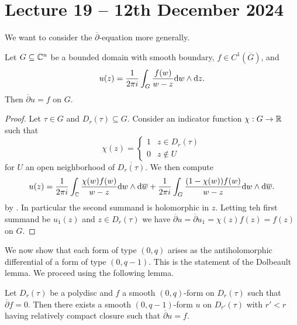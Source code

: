 \section{Lecture 19 -- 12th December 2024}\label{sec: lecture 19}
We want to consider the $\overline{\partial}$-equation more generally. 
\begin{theorem}\label{thm: smooth solution to 0-1 forms}
    Let $G\subseteq\mathbb{C}^{n}$ be a bounded domain with smooth boundary, $f\in C^{1}(\overline{G})$, and 
    $$u(z)=\frac{1}{2\pi i}\int_{G}\frac{f(w)}{w-z}\mathrm{d} w\wedge\mathrm{d} z.$$
    Then $\overline{\partial}u=f$ on $G$.
\end{theorem}
\begin{proof}
    Let $\tau\in G$ and $D_{r}(\tau)\subseteq G$. Consider an indicator function $\chi:G\to\mathbb{R}$ such that 
    $$\chi(z)=\begin{cases}
        1 & z\in D_{r}(\tau) \\
        0 & z\notin U
    \end{cases}$$
    for $U$ an open neighborhood of $\overline{D_{r}(\tau)}$. We then compute 
    $$u(z)=\frac{1}{2\pi i}\int_{\mathbb{C}}\frac{\chi(w)f(w)}{w-z}\mathrm{d} w\wedge\mathrm{d}\overline{w}+\frac{1}{2\pi i}\int_{G}\frac{(1-\chi(w))f(w)}{w-z}\mathrm{d} w\wedge\mathrm{d}\overline{w}.$$
    by . In particular the second summand is holomorphic in $z$. Letting teh first summand be $u_{1}(z)$ and $z\in D_{r}(\tau)$ we have $\overline{\partial}u=\overline{\partial} u_{1}=\chi(z)f(z)=f(z)$ on $G$. 
\end{proof}
We now show that each form of type $(0,q)$ arises as the antiholomorphic differential of a form of type $(0,q-1)$. This is the statement of the Dolbeault lemma. We proceed using the following lemma. 
\begin{lemma}\label{lem: Dolbeault lemma preparation}
    Let $D_{r}(\tau)$ be a polydisc and $f$ a smooth $(0,q)$-form on $D_{r}(\tau)$ such that $\overline{\partial}f=0$. Then there exists a smooth $(0,q-1)$-form $u$ on $D_{r'}(\tau)$ with $r'<r$ having relatively compact closure such that $\overline{\partial}u=f$. 
\end{lemma}
